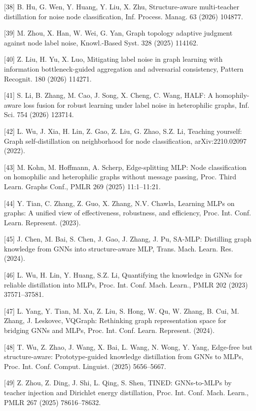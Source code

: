 {[}38{]} B. Hu, G. Wen, Y. Huang, Y. Liu, X. Zhu, Structure-aware multi-teacher distillation for noise node classification, Inf. Process. Manag. 63 (2026) 104877.

{[}39{]} M. Zhou, X. Han, W. Wei, G. Yan, Graph topology adaptive judgment against node label noise, Knowl.-Based Syst. 328 (2025) 114162.

{[}40{]} Z. Liu, H. Yu, X. Luo, Mitigating label noise in graph learning with information bottleneck-guided aggregation and adversarial consistency, Pattern Recognit. 180 (2026) 114271.

{[}41{]} S. Li, B. Zhang, M. Cao, J. Song, X. Cheng, C. Wang, HALF: A homophily-aware loss fusion for robust learning under label noise in heterophilic graphs, Inf. Sci. 754 (2026) 123714.

{[}42{]} L. Wu, J. Xia, H. Lin, Z. Gao, Z. Liu, G. Zhao, S.Z. Li, Teaching yourself: Graph self-distillation on neighborhood for node classification, arXiv:2210.02097 (2022).

{[}43{]} M. Kohn, M. Hoffmann, A. Scherp, Edge-splitting MLP: Node classification on homophilic and heterophilic graphs without message passing, Proc. Third Learn. Graphs Conf., PMLR 269 (2025) 11:1--11:21.

{[}44{]} Y. Tian, C. Zhang, Z. Guo, X. Zhang, N.V. Chawla, Learning MLPs on graphs: A unified view of effectiveness, robustness, and efficiency, Proc. Int. Conf. Learn. Represent. (2023).

{[}45{]} J. Chen, M. Bai, S. Chen, J. Gao, J. Zhang, J. Pu, SA-MLP: Distilling graph knowledge from GNNs into structure-aware MLP, Trans. Mach. Learn. Res. (2024).

{[}46{]} L. Wu, H. Lin, Y. Huang, S.Z. Li, Quantifying the knowledge in GNNs for reliable distillation into MLPs, Proc. Int. Conf. Mach. Learn., PMLR 202 (2023) 37571--37581.

{[}47{]} L. Yang, Y. Tian, M. Xu, Z. Liu, S. Hong, W. Qu, W. Zhang, B. Cui, M. Zhang, J. Leskovec, VQGraph: Rethinking graph representation space for bridging GNNs and MLPs, Proc. Int. Conf. Learn. Represent. (2024).

{[}48{]} T. Wu, Z. Zhao, J. Wang, X. Bai, L. Wang, N. Wong, Y. Yang, Edge-free but structure-aware: Prototype-guided knowledge distillation from GNNs to MLPs, Proc. Int. Conf. Comput. Linguist. (2025) 5656--5667.

{[}49{]} Z. Zhou, Z. Ding, J. Shi, L. Qing, S. Shen, TINED: GNNs-to-MLPs by teacher injection and Dirichlet energy distillation, Proc. Int. Conf. Mach. Learn., PMLR 267 (2025) 78616--78632.

